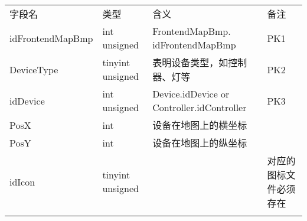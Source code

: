 \begin{longtabu}[c]{@{}lXXX@{}}
\toprule\addlinespace
字段名 & 类型 & 含义 & 备注
\\\addlinespace
\midrule\endhead
idFrontendMapBmp & int unsigned & FrontendMapBmp. idFrontendMapBmp & PK1
\\\addlinespace
DeviceType & tinyint unsigned & 表明设备类型，如控制器、灯等 & PK2
\\\addlinespace
idDevice & int unsigned & Device.idDevice or Controller.idController &
PK3
\\\addlinespace
PosX & int & 设备在地图上的横坐标 &
\\\addlinespace
PosY & int & 设备在地图上的纵坐标 &
\\\addlinespace
idIcon & tinyint unsigned & & 对应的图标文件必须存在
\\\addlinespace
\bottomrule
\end{longtabu}
